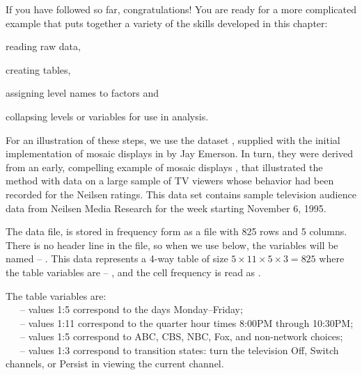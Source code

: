 \documentclass[10pt,krantz2]{krantz}\usepackage[]{graphicx}\usepackage[]{color}
\begin{document}
If you have followed so far, congratulations! You are ready for a more complicated example
that puts together a variety of the skills developed in this chapter:
\begin{seriate}
  \item reading raw data,
  \item creating tables,
  \item assigning level names to factors and
  \item collapsing levels or variables for use in analysis.
\end{seriate}

For an illustration of these steps,
we use the dataset , supplied with
the initial implementation of
mosaic displays in \R by Jay Emerson.
In turn, they were derived from an early, compelling example of mosaic displays
\citep{HartiganKleiner:84},
that illustrated the method with data on a large sample of TV viewers
whose behavior had been recorded for the Neilsen ratings.
This data set contains sample television audience data from Neilsen
Media Research for the week starting November 6, 1995.


The data file,  is stored in frequency form
as a file with 825 rows and 5 columns.  There is no header line
in the file, so when we use  below, the variables
will be named  -- .  This data represents
 a 4-way table of size
$5 \times 11 \times 5 \times 3 = 825$ where the table variables
are  -- , and the cell frequency is read
as .

\begin{flushleft}
The table variables are:\\
~~~-- values 1:5 correspond to the days Monday--Friday;\\
~~~-- values 1:11 correspond to the quarter hour times 8:00PM through 10:30PM;\\
~~~-- values 1:5 correspond to ABC, CBS, NBC, Fox, and non-network choices;\\
~~~-- values 1:3 correspond to transition states: turn the television Off, Switch channels,  or Persist in viewing the current channel.
\end{flushleft}
\end{document}
